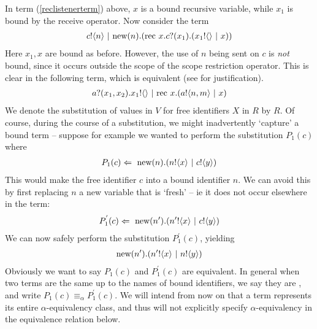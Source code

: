 	In term (\ref{reclistenerterm}) above, $x$ is a bound recursive variable, while $x_1$ is bound by the receive operator. Now consider the term
	\begin{align}
		{c}!\langle{n}\rangle \ |\  \text{new}({n}).(\text{rec }{x}.{c}?({x_1}).({x_1}!\langle{}\rangle \ |\  x))
	\end{align}
	Here $x_1, x$ are bound as before.  However, the use of $n$ being sent on $c$ is \emph{not} bound, since it occurs outside the scope of the scope restriction operator.  This is clear in the following term, which is equivalent (see  for justification).
	\begin{align}
		{a}?({x_1,x_2}).{x_1}!\langle{}\rangle \ |\  \text{rec }{x}.({a}!\langle{n,m}\rangle \ |\  x)
	\end{align}
	We denote the substitution of values in $V$ for free identifiers $X$ in $R$ by $R$.  Of course, during the course of a substitution, we might inadvertently `capture' a bound term -- suppose for example we wanted to perform the substitution $P_1(c)$ where
\begin{align}
	P_1(c) \Leftarrow\  \text{new}({n}).({n}!\langle{x}\rangle \ |\  {c}!\langle{y}\rangle)	
\end{align}	
This would make the free identifier $c$ into a bound identifier $n$.  We can avoid this by first replacing $n$ a new variable that is `fresh' -- ie it does not occur elsewhere in the term:
\begin{align}
	P_1^{'}(c) \Leftarrow\  \text{new}({n'}).({n'}!\langle{x}\rangle \ |\  {c}!\langle{y}\rangle)
\end{align}
We can now safely perform the substitution $P_1^{'}(c)$, yielding
\begin{align}
	\text{new}({n'}).({n'}!\langle{x}\rangle \ |\  {n}!\langle{y}\rangle)
\end{align}
	Obviously we want to say $P_1(c)$ and $P_1^{'}(c)$ are equivalent.  In general when two terms are the same up to the names of bound identifiers, we say they are , and write $P_1(c) \equiv_\alpha P_1^{'}(c)$.  We will intend from now on that a term represents its entire $\alpha$-equivalency class, and thus will not explicitly specify $\alpha$-equivalency in the equivalence relation below.

